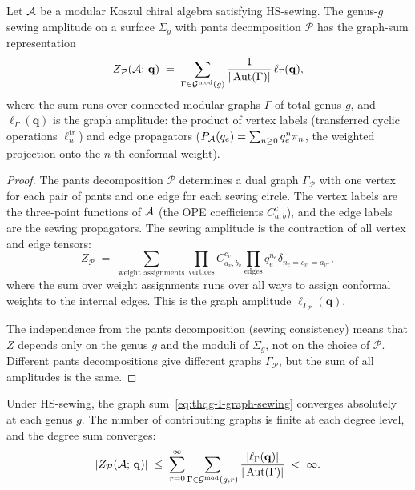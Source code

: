 \begin{proposition}
\label{prop:thqg-I-graph-sum-sewing}
Let $\mathcal{A}$ be a modular Koszul chiral algebra satisfying HS-sewing. The genus-$g$ sewing amplitude on a surface $\Sigma_g$ with pants decomposition $\mathcal{P}$ has the graph-sum representation
\begin{equation}\label{eq:thqg-I-graph-sewing}
Z_{\mathcal{P}}(\mathcal{A};\,\mathbf{q}) \;=\; \sum_{\Gamma \in \mathcal{G}^{\mathrm{mod}}(g)} \frac{1}{|\operatorname{Aut}(\Gamma)|}\,\ell_\Gamma(\mathbf{q}),
\end{equation}
where the sum runs over connected modular graphs $\Gamma$ of total genus $g$, and $\ell_\Gamma(\mathbf{q})$ is the graph amplitude: the product of vertex labels (transferred cyclic operations $\ell_n^{\mathrm{tr}}$) and edge propagators ($P_{\mathcal{A}}(q_e) = \sum_{n \geq 0} q_e^n \pi_n$, the weighted projection onto the $n$-th conformal weight).
\end{proposition}

\begin{proof}
The pants decomposition $\mathcal{P}$ determines a dual graph $\Gamma_\mathcal{P}$ with one vertex for each pair of pants and one edge for each sewing circle. The vertex labels are the three-point functions of $\mathcal{A}$ (the OPE coefficients $C^c_{a,b}$), and the edge labels are the sewing propagators. The sewing amplitude is the contraction of all vertex and edge tensors:
\[
Z_{\mathcal{P}} \;=\; \sum_{\text{weight assignments}} \prod_{\text{vertices}} C^{c_v}_{a_v,b_v} \prod_{\text{edges}} q_e^{n_e} \delta_{n_e = c_{v'} = a_{v''}},
\]
where the sum over weight assignments runs over all ways to assign conformal weights to the internal edges. This is the graph amplitude $\ell_{\Gamma_\mathcal{P}}(\mathbf{q})$.

The independence from the pants decomposition (sewing consistency) means that $Z$ depends only on the genus $g$ and the moduli of $\Sigma_g$, not on the choice of $\mathcal{P}$. Different pants decompositions give different graphs $\Gamma_\mathcal{P}$, but the sum of all amplitudes is the same.
\end{proof}

\begin{proposition}
\label{prop:thqg-I-graph-sum-convergence}
Under HS-sewing, the graph sum~\eqref{eq:thqg-I-graph-sewing} converges absolutely at each genus $g$. The number of contributing graphs is finite at each degree level, and the degree sum converges:
\begin{equation}\label{eq:thqg-I-graph-sum-degree}
|Z_{\mathcal{P}}(\mathcal{A};\,\mathbf{q})| \;\leq\; \sum_{r=0}^{\infty} \sum_{\Gamma \in \mathcal{G}^{\mathrm{mod}}(g,r)} \frac{|\ell_\Gamma(\mathbf{q})|}{|\operatorname{Aut}(\Gamma)|} \;<\; \infty.
\end{equation}
\end{proposition}


